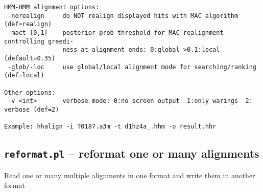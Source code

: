\documentclass[11pt,a4paper]{article}
\begin{document}
\begin{verbatim}
HMM-HMM alignment options:                                                       
 -norealign     do NOT realign displayed hits with MAC algorithm (def=realign)   
 -mact [0,1[    posterior prob threshold for MAC realignment controlling greedi- 
                ness at alignment ends: 0:global >0.1:local (default=0.35)       
 -glob/-loc     use global/local alignment mode for searching/ranking (def=local)

Other options:                                                                   
 -v <int>       verbose mode: 0:no screen output  1:only warings  2: verbose (def=2)

Example: hhalign -i T0187.a3m -t d1hz4a_.hhm -o result.hhr
\end{verbatim} 
\normalsize


\subsection{{\tt reformat.pl} -- reformat one or many alignments}

Read one or many multiple alignments in one format and write them in another format
\end{document}
